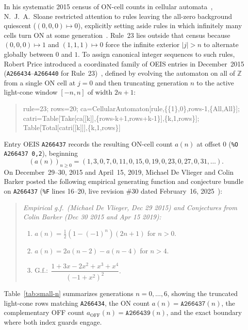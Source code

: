 \documentclass[11pt]{article}
\theoremstyle{definition}
\newcommand{\Z}{\mathbb{Z}}
\newcommand{\seq}[1]{\texttt{#1}}
\begin{document}
In his systematic 2015 census of ON-cell counts in cellular automata~\cite{sloane2015}, N.~J.~A.\ Sloane restricted attention to rules leaving the all-zero background quiescent ($(0, 0, 0) \mapsto 0$), explicitly setting aside rules in which infinitely many cells turn ON at some generation~\cite[\S6.1]{sloane2015}. Rule~23 lies outside that census because $(0, 0, 0) \mapsto 1$ and $(1, 1, 1) \mapsto 0$ force the infinite exterior $|j| > n$ to alternate globally between $0$ and $1$. To assign canonical integer sequences to such rules, Robert Price introduced a coordinated family of OEIS entries in December~2015 (\seq{A266434}--\seq{A266440} for Rule~23)~\cite{oeis266437,oeis266439,oeis266434}, defined by evolving the automaton on all of $\Z$ from a single ON cell at $j = 0$ and then truncating generation $n$ to the active light-cone window $[-n, n]$ of width $2n + 1$:
\begin{quote}\small\ttfamily
rule=23; rows=20; ca=CellularAutomaton[rule,\{\{1\},0\},rows-1,\{All,All\}];\\
catri=Table[Take[ca[[k]],\{rows-k+1,rows+k-1\}],\{k,1,rows\}];\\
Table[Total[catri[[k]]],\{k,1,rows\}]
\end{quote}
Entry OEIS \seq{A266437} records the resulting ON-cell count $a(n)$ at offset $0$ (\texttt{\%O A266437 0,2}), beginning
\[
(a(n))_{n \ge 0} = (1, 3, 0, 7, 0, 11, 0, 15, 0, 19, 0, 23, 0, 27, 0, 31, \dots).
\]
On December~29--30, 2015 and April~15, 2019, Michael De Vlieger and Colin Barker posted the following empirical generating function and conjecture bundle on \seq{A266437} (\texttt{\%F} lines 16--20, live revision \#30 dated February~16, 2025~\cite{oeis266437}):
\begin{quote}\itshape
Empirical g.f.\ (Michael De Vlieger, Dec 29 2015) and Conjectures from Colin Barker (Dec 30 2015 and Apr 15 2019):
\begin{enumerate}
\item $a(n) = \tfrac{1}{2}(1 - (-1)^n)(2n + 1)$ for $n > 0$.
\item $a(n) = 2a(n - 2) - a(n - 4)$ for $n > 4$.
\item $\mathrm{G.f.:}\; \dfrac{1 + 3x - 2x^2 + x^3 + x^4}{(-1 + x^2)^2}$.
\end{enumerate}
\end{quote}

Table~\ref{tab:small-n} summarizes generations $n = 0, \dots, 6$, showing the truncated light-cone rows matching \seq{A266434}, the ON count $a(n) = \seq{A266437}(n)$, the complementary OFF count $a_{\mathrm{OFF}}(n) = \seq{A266439}(n)$, and the exact boundary where both index guards engage.
\end{document}
